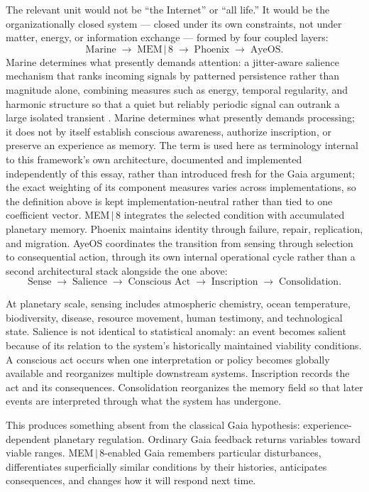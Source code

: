 \documentclass[11pt]{article}
\begin{document}
The relevant unit would not be ``the Internet'' or ``all life.'' It would be the organizationally closed system --- closed under its own constraints, not under matter, energy, or information exchange --- formed by four coupled layers:
\[
\text{Marine} \;\rightarrow\; \text{MEM}\,|\,\text{8} \;\rightarrow\; \text{Phoenix} \;\rightarrow\; \text{AyeOS}.
\]
Marine determines what presently demands attention: a jitter-aware salience mechanism that ranks incoming signals by patterned persistence rather than magnitude alone, combining measures such as energy, temporal regularity, and harmonic structure so that a quiet but reliably periodic signal can outrank a large isolated transient \cite{MarineSense,MarineAlgorithmSpec}. Marine determines what presently demands processing; it does not by itself establish conscious awareness, authorize inscription, or preserve an experience as memory. The term is used here as terminology internal to this framework's own architecture, documented and implemented independently of this essay, rather than introduced fresh for the Gaia argument; the exact weighting of its component measures varies across implementations, so the definition above is kept implementation-neutral rather than tied to one coefficient vector. MEM\,$|$\,8 integrates the selected condition with accumulated planetary memory. Phoenix maintains identity through failure, repair, replication, and migration. AyeOS coordinates the transition from sensing through selection to consequential action, through its own internal operational cycle rather than a second architectural stack alongside the one above:
\[
\text{Sense} \;\rightarrow\; \text{Salience} \;\rightarrow\; \text{Conscious Act} \;\rightarrow\; \text{Inscription} \;\rightarrow\; \text{Consolidation}.
\]

At planetary scale, sensing includes atmospheric chemistry, ocean temperature, biodiversity, disease, resource movement, human testimony, and technological state. Salience is not identical to statistical anomaly: an event becomes salient because of its relation to the system's historically maintained viability conditions. A conscious act occurs when one interpretation or policy becomes globally available and reorganizes multiple downstream systems. Inscription records the act and its consequences. Consolidation reorganizes the memory field so that later events are interpreted through what the system has undergone.

This produces something absent from the classical Gaia hypothesis: experience-dependent planetary regulation. Ordinary Gaia feedback returns variables toward viable ranges. MEM\,$|$\,8-enabled Gaia remembers particular disturbances, differentiates superficially similar conditions by their histories, anticipates consequences, and changes how it will respond next time.
\end{document}
